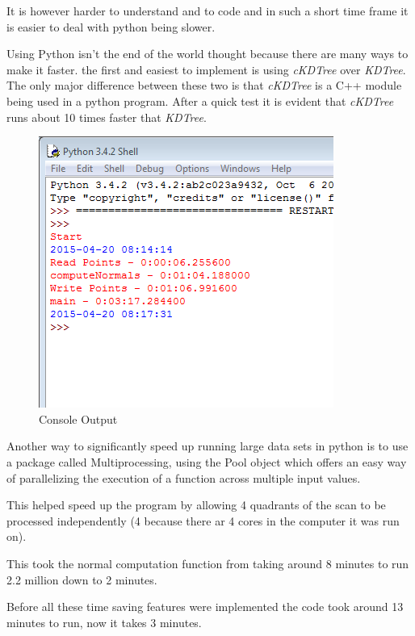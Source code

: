 \documentclass[11pt,a4paper]{article}
\begin{document}
	It is however harder to understand and to code and in such a short time frame it is easier to deal with python being slower.
	
	Using Python isn't the end of the world thought because there are many ways to make it faster. the first and easiest to implement is using \textit{cKDTree} over \textit{KDTree}. The only major difference between these two is that \textit{cKDTree} is a C++ module being used in a python program. After a quick test it is evident that \textit{cKDTree} runs about 10 times faster that \textit{KDTree}.
	
	\begin{figure}
		\centering
	 	\includegraphics[width=0.8\linewidth]{./consoloutput}
	 	\caption{Console Output}
	 	\label{fig:consoloutput}
	\end{figure}
		
	Another way to significantly speed up running large data sets in python is to use a package called Multiprocessing, using the Pool object which offers an easy way of parallelizing the execution of a function across multiple input values.

	This helped speed up the program by allowing 4 quadrants of the scan to be processed independently (4 because there ar 4 cores in the computer it was run on).
	
	This took the normal computation function from taking around 8 minutes to run 2.2 million down to 2 minutes.
	
	Before all these time saving features were implemented the code took around 13 minutes to run, now it takes 3 minutes.
	
\end{document}
